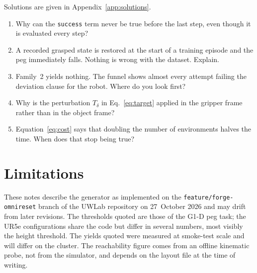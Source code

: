 \documentclass{article}
\newcommand{\code}[1]{\texttt{#1}}
\begin{document}
Solutions are given in Appendix~\ref{app:solutions}.
\begin{enumerate}[leftmargin=*, itemsep=3pt, label=\textbf{E\arabic*.}]
  \item Why can the \code{success} term never be true before the last step, even though it is evaluated every step?
  \item A recorded grasped state is restored at the start of a training episode and the peg immediately falls. Nothing is wrong with the dataset. Explain.
  \item Family~2 yields nothing. The funnel shows almost every attempt failing the deviation clause for the robot. Where do you look first?
  \item Why is the perturbation $T_\delta$ in Eq.~\eqref{eq:target} applied in the gripper frame rather than in the object frame?
  \item Equation~\eqref{eq:cost} says that doubling the number of environments halves the time. When does that stop being true?
\end{enumerate}

\section{Limitations}

These notes describe the generator as implemented on the \code{feature/forge-omnireset} branch of the UWLab repository on 27~October 2026 and may drift from later revisions. The thresholds quoted are those of the G1-D peg task; the UR5e configurations share the code but differ in several numbers, most visibly the height threshold. The yields quoted were measured at smoke-test scale and will differ on the cluster. The reachability figure comes from an offline kinematic probe, not from the simulator, and depends on the layout file at the time of writing.



\appendix
\end{document}
